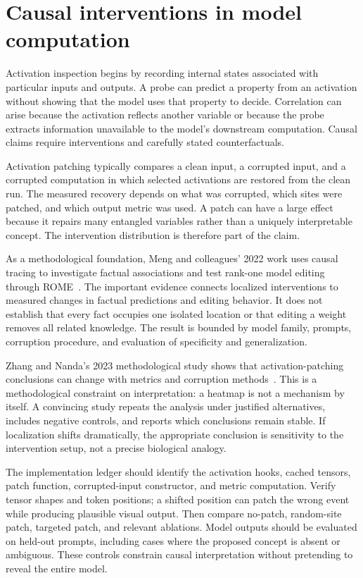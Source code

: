 \section{Causal interventions in model computation}\label{sec:C25:interventions}
Activation inspection begins by recording internal states associated with particular inputs and outputs. A probe can predict a property from an activation without showing that the model uses that property to decide. Correlation can arise because the activation reflects another variable or because the probe extracts information unavailable to the model's downstream computation. Causal claims require interventions and carefully stated counterfactuals.

Activation patching typically compares a clean input, a corrupted input, and a corrupted computation in which selected activations are restored from the clean run. The measured recovery depends on what was corrupted, which sites were patched, and which output metric was used. A patch can have a large effect because it repairs many entangled variables rather than a uniquely interpretable concept. The intervention distribution is therefore part of the claim.

As a methodological foundation, Meng and colleagues' 2022 work uses causal tracing to investigate factual associations and test rank-one model editing through ROME~\cite{meng2022rome}. The important evidence connects localized interventions to measured changes in factual predictions and editing behavior. It does not establish that every fact occupies one isolated location or that editing a weight removes all related knowledge. The result is bounded by model family, prompts, corruption procedure, and evaluation of specificity and generalization.

Zhang and Nanda's 2023 methodological study shows that activation-patching conclusions can change with metrics and corruption methods~\cite{zhang2023patching}. This is a methodological constraint on interpretation: a heatmap is not a mechanism by itself. A convincing study repeats the analysis under justified alternatives, includes negative controls, and reports which conclusions remain stable. If localization shifts dramatically, the appropriate conclusion is sensitivity to the intervention setup, not a precise biological analogy.

The implementation ledger should identify the activation hooks, cached tensors, patch function, corrupted-input constructor, and metric computation. Verify tensor shapes and token positions; a shifted position can patch the wrong event while producing plausible visual output. Then compare no-patch, random-site patch, targeted patch, and relevant ablations. Model outputs should be evaluated on held-out prompts, including cases where the proposed concept is absent or ambiguous. These controls constrain causal interpretation without pretending to reveal the entire model.

